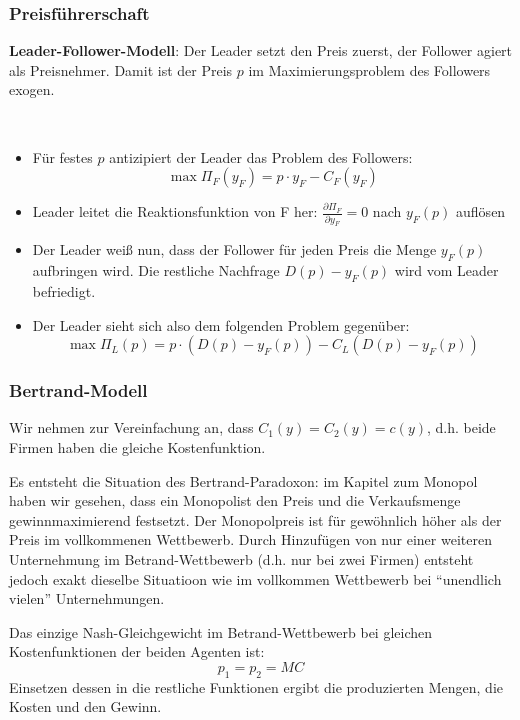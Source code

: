 \subsubsection*{Preisführerschaft}

\textbf{Leader-Follower-Modell}: Der Leader setzt den Preis zuerst, der Follower agiert als Preisnehmer. Damit ist der Preis $p$ im Maximierungsproblem des Followers exogen.

\begin{kr}[Preisführerschaft] ~\
	\begin{itemize}
		\item Für festes $p$ antizipiert der Leader das Problem des Followers:
			$$ \max \Pi_F(y_F) = p \cdot y_F - C_F(y_F) $$	
		\item Leader leitet die Reaktionsfunktion von F her: $\frac{\partial \Pi_F}{\partial y_F} = 0$ nach $y_F(p)$ auflösen
		\item Der Leader weiß nun, dass der Follower für jeden Preis die Menge $y_F(p)$ aufbringen wird. Die restliche Nachfrage $D(p) - y_F(p)$ wird vom Leader befriedigt.
		\item Der Leader sieht sich also dem folgenden Problem gegenüber:
			$$ \max \Pi_L(p) = p \cdot \left( D(p) - y_F(p) \right) - C_L \left(D(p) - y_F(p) \right) $$
	\end{itemize}
\end{kr}

\subsubsection*{Bertrand-Modell}

Wir nehmen zur Vereinfachung an, dass $C_1(y) = C_2(y) = c(y)$, d.h. beide Firmen haben die gleiche Kostenfunktion. ~\bigskip

Es entsteht die Situation des Bertrand-Paradoxon: im Kapitel zum Monopol haben wir gesehen, dass ein Monopolist den Preis und die Verkaufsmenge gewinnmaximierend festsetzt. Der Monopolpreis ist für gewöhnlich höher als der Preis im vollkommenen Wettbewerb. Durch Hinzufügen von nur einer weiteren Unternehmung im Betrand-Wettbewerb (d.h. nur bei zwei Firmen) entsteht jedoch exakt dieselbe Situatioon wie im vollkommen Wettbewerb bei \enquote{unendlich vielen} Unternehmungen.

\begin{kr}[Betrand]
	Das einzige Nash-Gleichgewicht im Betrand-Wettbewerb bei gleichen Kostenfunktionen der beiden Agenten ist:
	$$ p_1 = p_2 = MC $$	
	Einsetzen dessen in die restliche Funktionen ergibt die produzierten Mengen, die Kosten und den Gewinn.
\end{kr}

